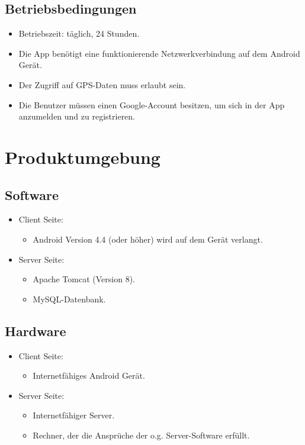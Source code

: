 \documentclass[parskip=full]{scrartcl}
\begin{document}
\subsection{Betriebsbedingungen}\label{Betriebsbedingungen}
\begin{itemize}
	\item Betriebszeit: täglich, 24 Stunden.
	\item Die App benötigt eine funktionierende Netzwerkverbindung auf dem Android Gerät.
	\item Der Zugriff auf GPS-Daten muss erlaubt sein.
	\item Die Benutzer müssen einen \gls{Google-Account} besitzen, um sich in der App anzumelden und zu registrieren.
\end{itemize}

\newpage
\section{Produktumgebung}

\subsection{Software}
\begin{itemize}
	\item Client Seite:
	\begin{itemize}
		\item Android Version 4.4 (oder höher) wird auf dem Gerät verlangt.
	\end{itemize}
	
	\item Server Seite:
	\begin{itemize} 
        \item Apache Tomcat (Version 8).
		\item MySQL-Datenbank.
    \end{itemize}
\end{itemize}


\subsection{Hardware}
\begin{itemize}
	\item Client Seite:
	\begin{itemize} 
		\item Internetfähiges Android Gerät.
	\end{itemize}
	
	\item Server Seite:
	\begin{itemize}
		\item Internetfähiger Server.
		\item Rechner, der die Ansprüche der o.g. Server-Software erfüllt.
	\end{itemize}		
\end{itemize}
\end{document}
